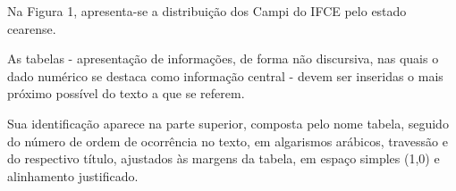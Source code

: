 Na Figura 1, apresenta-se a distribuição dos Campi do IFCE pelo estado cearense.

\begin{figure}[!h]
\centering
\label{fig:exemplo-1}
\end{figure}

\newpage


As tabelas - apresentação de informações, de forma não discursiva, nas quais o dado numérico se destaca como informação central - devem ser inseridas o mais próximo possível do texto a que se referem.

Sua identificação aparece na parte superior, composta pelo nome tabela, seguido do número de ordem de ocorrência no texto, em algarismos arábicos, travessão e do respectivo título, ajustados às margens da tabela, em espaço simples (1,0) e alinhamento justificado.

